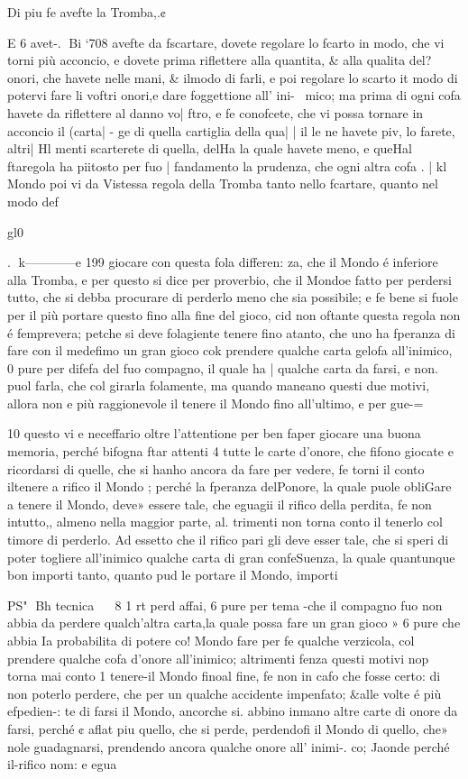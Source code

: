 \documentclass[12pt,a6paper]{article}
\begin{document}
Di piu fe avefte la Tromba,.¢

E 6 avet-.
Bi ‘708
avefte da fscartare, dovete regolare lo fcarto in modo, che vi
torni più acconcio, e dovete
prima riflettere alla quantita, &
alla qualita del?onori, che havete nelle mani, & ilmodo di
farli, e poi regolare lo scarto it
modo di potervi fare li voftri
onori,e dare foggettione all’ ini-~
mico; ma prima di ogni cofa
havete da riflettere al danno vo| ftro, e fe conofcete, che vi possa tornare in acconcio il (carta| - ge di quella cartiglia della qua| | il le ne havete piv, lo farete, altri| Hl menti scarterete di quella, delHa la quale havete meno, e queHal ftaregola ha piitosto per fuo
| fandamento la prudenza, che
ogni altra cofa .
| kl Mondo poi vi da Vistessa regola della Tromba tanto nello
fcartare, quanto nel modo def

gl0~

.
k————e
199
giocare con questa fola differen:
za, che il Mondo é inferiore alla Tromba, e per questo si dice
per proverbio, che il Mondoe
fatto per perdersi tutto, che si
debba procurare di perderlo
meno che sia possibile; e fe bene
si fuole per il più portare questo
fino alla fine del gioco, cid non
oftante questa regola non é femprevera; petche si deve folagiente tenere fino atanto, che
uno ha fperanza di fare con il
medefimo un gran gioco cok
prendere qualche carta gelofa
all’inimico, 0 pure per difefa
del fuo compagno, il quale ha
| qualche carta da farsi, e non.
puol farla, che col girarla folamente, ma quando man¢ano
questi due motivi, allora non e
più raggionevole il tenere il
Mondo fino all’ultimo, e per
gue-=

 
 

10
questo vi e neceffario oltre l’attentione per ben faper giocare
una buona memoria, perché bifogna ftar attenti 4 tutte le carte d’onore, che fifono giocate
e ricordarsi di quelle, che si hanho ancora da fare per vedere,
fe torni il conto iltenere a rifico il Mondo ; perché la fperanza
delPonore, la quale puole obliGare a tenere il Mondo, deve»
essere tale, che eguagii il rifico
della perdita, fe non intutto,,
almeno nella maggior parte, al.
trimenti non torna conto il tenerlo col timore di perderlo.
Ad essetto che il rifico pari
gli deve esser tale, che si speri
di poter togliere all’inimico
qualche carta di gran confeSuenza, la quale quantunque
bon importi tanto, quanto pud
le portare il Mondo, importi

PS"
Bh tecnica
~~ 8 1 rt
perd affai, 6 pure per tema
-che il compagno fuo non abbia
da perdere qualch’altra carta,la
quale possa fare un gran gioco »
6 pure che abbia Ia probabilita
di potere co! Mondo fare per fe
qualche verzicola, col prendere
qualche cofa d’onore all’inimico; altrimenti fenza questi motivi nop torna mai conto 1 tenere-il Mondo finoal fine, fe
non in cafo che fosse certo: di
non poterlo perdere, che per
un qualche accidente impenfato; &alle volte é più efpedien-:
te di farsi il Mondo, ancorche si.
abbino inmano altre carte di
onore da farsi, perché ¢ aflat
piu quello, che si perde, perdendofi il Mondo di quello, che»
nole guadagnarsi, prendendo
ancora qualche onore all’ inimi-.
co; Jaonde perché il-rifico nom:
e egua 
\end{document}
